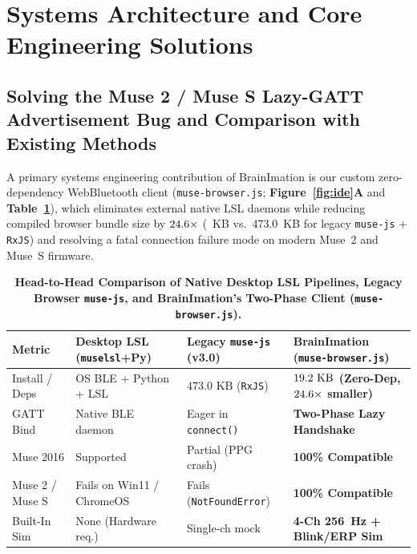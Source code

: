 \documentclass[10pt,twocolumn]{article}
\begin{document}
\section{Systems Architecture and Core Engineering Solutions}

\subsection{Solving the Muse 2 / Muse S Lazy-GATT Advertisement Bug and Comparison with Existing Methods}
A primary systems engineering contribution of BrainImation is our custom zero-dependency WebBluetooth client (\texttt{muse-browser.js}; \textbf{Figure~\ref{fig:ide}A} and \textbf{Table~\ref{tab:gatt}}), which eliminates external native LSL daemons while reducing compiled browser bundle size by $24.6\times$ (\MuseBrowserKB~KB vs.\ 473.0~KB for legacy \texttt{muse-js} + \texttt{RxJS}) and resolving a fatal connection failure mode on modern Muse~2 and Muse~S firmware.

\begin{table}[t!]
\centering
\caption{\textbf{Head-to-Head Comparison of Native Desktop LSL Pipelines, Legacy Browser \texttt{muse-js}, and BrainImation's Two-Phase Client (\texttt{muse-browser.js}).}}
\label{tab:gatt}
\scriptsize
\setlength{\tabcolsep}{2.4pt}
\begin{tabular}{p{}p{}p{}p{}}
\toprule
\textbf{Metric} & \textbf{Desktop LSL (\texttt{muselsl}+Py)} & \textbf{Legacy \texttt{muse-js} (v3.0)} & \textbf{BrainImation (\texttt{muse-browser.js})} \\
\midrule
Install / Deps & OS BLE + Python + LSL & $473.0\text{ KB}$ (\texttt{RxJS}) & \textbf{$19.2\text{ KB}$ (Zero-Dep, $24.6\times$ smaller)} \\
GATT Bind & Native BLE daemon & Eager in \texttt{connect()} & \textbf{Two-Phase Lazy Handshake} \\
Muse 2016 & Supported & Partial (PPG crash) & \textbf{100\% Compatible} \\
Muse 2 / Muse S & Fails on Win11 / ChromeOS & Fails (\texttt{NotFoundError}) & \textbf{100\% Compatible} \\
Built-In Sim & None (Hardware req.) & Single-ch mock & \textbf{4-Ch 256~Hz + Blink/ERP Sim} \\
\bottomrule
\end{tabular}
\end{table}
\end{document}
